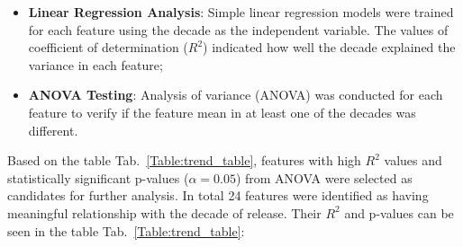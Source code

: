 \begin{itemize}
  \item \textbf{Linear Regression Analysis}: Simple linear regression models
    were trained for each feature using the decade as the independent variable.
    The values of coefficient of determination ($R^2$) indicated how well the
    decade explained the variance in each feature;
  \item \textbf{ANOVA Testing}: Analysis of variance (ANOVA) was conducted for
    each feature to verify if the feature mean in at least one of the decades
    was different.
\end{itemize}

Based on the table Tab.~\ref{Table:trend_table}, features with high $R^2$
values and statistically significant p-values ($\alpha = 0.05$) from ANOVA were
selected as candidates for further analysis. In total 24 features were
identified as having meaningful relationship with the decade of release. Their
$R^2$ and p-values can be seen in the table Tab.~\ref{Table:trend_table}:


